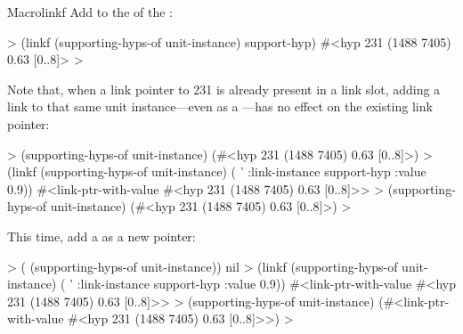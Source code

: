 \documentclass[10pt,twoside,english,pdftex]{article}
\begin{document}
\begin{functiondoc}{Macro}{linkf}
\fnexamples
%
Add  to the 
 
of the   :
%
\W\supp
\begin{example}
  > (linkf (supporting-hyps-of unit-instance) support-hyp)
  #<hyp 231 (1488 7405) 0.63 [0..8]>
  >
\end{example}
%
Note that, when a link pointer to  231 is already present in
a link slot, adding a link to that same  unit instance---even
as a ---has no effect on the existing link pointer:
%
\W\supp\notpretop
\begin{example}
  > (supporting-hyps-of unit-instance)
  (#<hyp 231 (1488 7405) 0.63 [0..8]>)
  > (linkf (supporting-hyps-of unit-instance) 
           ( '
               :link-instance support-hyp
               :value 0.9))
  #<link-ptr-with-value #<hyp 231 (1488 7405) 0.63 [0..8]>>
  > (supporting-hyps-of unit-instance)
  (#<hyp 231 (1488 7405) 0.63 [0..8]>)
  >
\end{example}
%
This time, add a  as a new pointer:
%
\W\supp\notpretop
\begin{example}
  > ( (supporting-hyps-of unit-instance))
  nil
  > (linkf (supporting-hyps-of unit-instance) 
           ( '
               :link-instance support-hyp
               :value 0.9))
  #<link-ptr-with-value #<hyp 231 (1488 7405) 0.63 [0..8]>>
  > (supporting-hyps-of unit-instance)
  (#<link-ptr-with-value #<hyp 231 (1488 7405) 0.63 [0..8]>>)
  >
\end{example}

\end{functiondoc}

\end{document}
